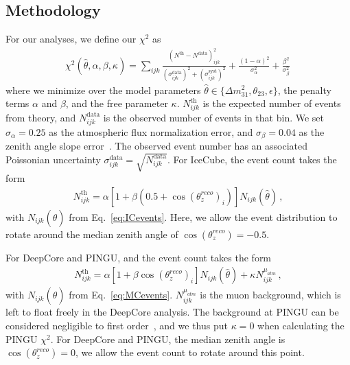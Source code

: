 \documentclass[draft=True]{revtex4-2}
\newcommand{\zreco}{\ensuremath{\cos{(\theta_z^{reco})}}}
\newcommand{\dm}{\Delta m^2_{31}}
\begin{document}
\subsection{Methodology}\label{sec:method}
For our analyses, we define our $\chi^2$ as
\begin{align} \label{eq:chisq}
    \chi^{2}(\hat{\theta},\alpha,\beta, \kappa)=\sum_{ijk} \frac{\left(N^\text{th}-N^\text{data}\right)_{ijk}^{2}}
    {\left(\sigma^\text{data}_{ijk}\right)^{2} + \left(\sigma^\text{syst}_{ijk}\right)^{2}}+ 
    \frac{(1-\alpha)^2}{\sigma_\alpha^2} + \frac{\beta^2}{\sigma_\beta^2}\,
\end{align}
where we minimize over the model parameters $\hat{\theta} \in \{\dm, \theta_{23}, \epsilon\}$, the penalty terms $\alpha$ and $\beta$, and the free parameter $\kappa$.
$N_{ijk}^\text{th}$ is the expected number of events from theory, and $N_{ijk}^\text{data}$ is the observed number of events in that bin. 
We set $\sigma_\alpha = 0.25$ as the atmospheric flux normalization error, and $\sigma_\beta = 0.04$ as the zenith angle slope error~\cite{hondapaper}. 
The observed event number has an associated Poissonian uncertainty $\sigma_{ijk}^\text{data} = \sqrt{N_{ijk}^\text{data}}$.
For IceCube, the event count takes the form
\begin{align}
    N^\text{th}_{ijk} = \alpha\left[1+\beta (0.5 + \zreco_i )\right] N_{ijk}(\hat{\theta})\,,
\end{align}
with $N_{ijk}(\hat{\theta})$ from Eq.~\ref{eq:ICevents}. Here, we allow the event distribution to rotate around the median zenith angle of $\zreco = -0.5$.

For DeepCore and PINGU, and the event count takes the form
\begin{align}
    N^\text{th}_{ijk} = \alpha\left[1+\beta \zreco_i \right] N_{ijk}(\hat{\theta}) + \kappa N_{ijk}^{\mu_{atm}}\,,
\end{align}
with $N_{ijk}(\hat{\theta})$ from Eq.~\ref{eq:MCevents}. $N_{ijk}^{\mu_{atm}}$ is the muon background, which is left to float freely in the DeepCore analysis.
The background at PINGU can be considered negligible to first order~\cite{PINGUdata}, and we thus put $\kappa=0$ when calculating the PINGU $\chi^2$.
For DeepCore and PINGU, the median zenith angle is $\zreco = 0$, we allow the event count to rotate around this point.
\end{document}
